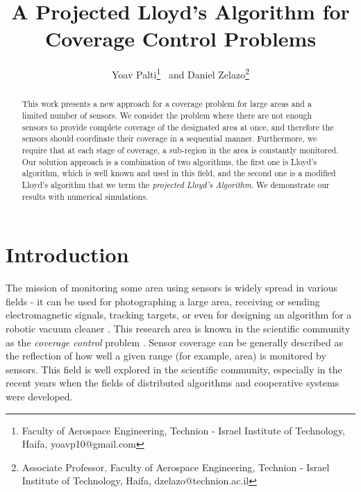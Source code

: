 \documentclass{iacas}
\begin{document}

\title{A Projected Lloyd's Algorithm for Coverage Control Problems}

\author{%
  Yoav Palti\thanks{Faculty of Aerospace Engineering, Technion - Israel Institute of Technology, Haifa, yoavp10@gmail.com}
  \ and
  Daniel Zelazo\thanks{Associate Professor, Faculty of Aerospace Engineering, Technion - Israel Institute of Technology, Haifa, dzelazo@technion.ac.il}
}

\maketitle

\begin{abstract}
This work presents a new approach for a coverage problem for large areas and a limited number of sensors. We consider the problem where there are not enough sensors to provide complete coverage of the designated area at once, and therefore the sensors should coordinate their coverage in a sequential manner.  Furthermore, we require that at each stage of coverage, a sub-region in the area is constantly monitored. Our solution approach is a combination of two algorithms, the first one is Lloyd's algorithm, which is well known and used in this field, and the second one is a modified Lloyd's algorithm that we term the \emph{projected Lloyd's Algorithm}. We demonstrate our results with numerical simulations.
\end{abstract}

\section{Introduction}
The mission of monitoring some area using sensors is widely spread in various fields - it can be used for photographing a large area, receiving or sending electromagnetic signals, tracking targets, or even for designing an algorithm for a robotic vacuum cleaner \cite{Nigam2012, 7798796, 7798244}.
%
This research area is known in the scientific community as the \emph{coverage control} problem \cite{Cassandras2005}. Sensor coverage can be generally described as the reflection of how well a given range (for example, area) is monitored by sensors. This field is well explored in the scientific community, especially in the recent years when the fields of distributed algorithms and cooperative systems were developed.
\end{document}
